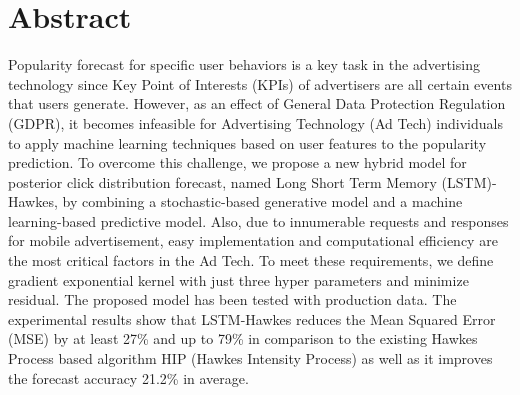 \documentclass[10pt,letterpaper]{article}
\begin{document}
\section*{Abstract}
Popularity forecast for specific user behaviors is a key task in the advertising technology since Key Point of Interests (KPIs) of advertisers are all certain events that users generate. However, as an effect of General Data Protection Regulation (GDPR), it becomes infeasible for Advertising Technology (Ad Tech) individuals to apply machine learning techniques based on user features to the popularity prediction. To overcome this challenge, we propose a new hybrid model for posterior click distribution forecast, named Long Short Term Memory (LSTM)-Hawkes, by combining a stochastic-based generative model and a machine learning-based predictive model. Also, due to innumerable requests and responses for mobile advertisement, easy implementation and computational efficiency are the most critical factors in the Ad Tech. To meet these requirements, we define gradient exponential kernel with just three hyper parameters and minimize residual. The proposed model has been tested with production data. The experimental results show that LSTM-Hawkes reduces the Mean Squared Error (MSE) by at least 27\% and up to 79\% in comparison to the existing Hawkes Process based algorithm HIP (Hawkes Intensity Process) as well as it improves the forecast accuracy 21.2\% in average.



\end{document}
